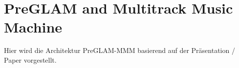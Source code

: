 \section{PreGLAM and Multitrack Music Machine}

Hier wird die Architektur PreGLAM-MMM basierend
auf der Präsentation / Paper vorgestellt.

